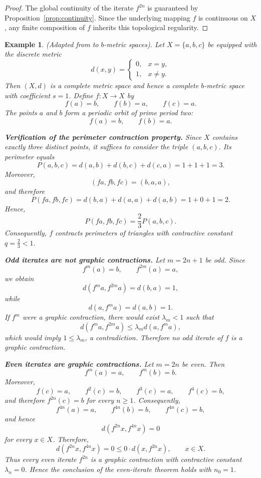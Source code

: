 \documentclass[a4paper,12pt,oneside]{article}
\newtheorem{example}[theorem]{Example}
\numberwithin{equation}{section}
\begin{document}
\begin{proof}
\medskip\noindent
The global continuity of the iterate $f^{2n}$ is guaranteed by Proposition~\ref{prop:continuity}. Since the underlying mapping $f$ is continuous on $X$, any finite composition of $f$ inherits this topological regularity. 
\end{proof}

\begin{example}
\label{ex:even_iterates}
(Adapted from \cite{cvetkovic2026} to $b$-metric spaces). Let
\(X = \{a,b,c\}\)
be equipped with the discrete metric
\[
d(x,y) = 
\begin{cases}
0, & x=y,\\
1, & x\neq y.
\end{cases}
\]
Then $(X,d)$ is a complete metric space and hence a complete $b$-metric space with coefficient $s=1$. Define $f:X\to X$ by
\[
f(a) = b,\qquad f(b) = a,\qquad f(c) = a.
\]
The points $a$ and $b$ form a periodic orbit of prime period two:
\[
f(a) = b,\qquad f(b) = a.
\]

\noindent\textbf{Verification of the perimeter contraction property.}
Since $X$ contains exactly three distinct points, it suffices to consider the triple $(a,b,c)$. Its perimeter equals
\[
P(a,b,c) = d(a,b) + d(b,c) + d(c,a) = 1 + 1 + 1 = 3.
\]
Moreover,
\[
(fa,fb,fc) = (b,a,a),
\]
and therefore
\[
P(fa,fb,fc) = d(b,a) + d(a,a) + d(a,b) = 1 + 0 + 1 = 2.
\]
Hence,
\[
P(fa,fb,fc) = \frac{2}{3} P(a,b,c).
\]
Consequently, $f$ contracts perimeters of triangles with contractive constant $q = \frac{2}{3} < 1$.

\noindent\textbf{Odd iterates are not graphic contractions.}
Let $m = 2n + 1$ be odd. Since
\[
f^{m}(a) = b,\qquad f^{2m}(a) = a,
\]
we obtain
\[
d(f^{m}a,f^{2m}a) = d(b,a) = 1,
\]
while
\[
d(a,f^{m}a) = d(a,b) = 1.
\]
If $f^{m}$ were a graphic contraction, there would exist $\lambda_{m}<1$ such that
\[
d(f^{m}a,f^{2m}a)\leq \lambda_{m}d(a,f^{m}a),
\]
which would imply $1\leq \lambda_{m}$, a contradiction. Therefore no odd iterate of $f$ is a graphic contraction.

\noindent\textbf{Even iterates are graphic contractions.}
Let $m = 2n$ be even. Then
\[
f^{m}(a) = a,\qquad f^{m}(b) = b.
\]
Moreover,
\[
f(c) = a,\qquad f^{2}(c) = b,\qquad f^{3}(c) = a,\qquad f^{4}(c) = b,
\]
and therefore $f^{2n}(c) = b$ for every $n\geq 1$. Consequently,
\[
f^{4n}(a) = a,\qquad f^{4n}(b) = b,\qquad f^{4n}(c) = b,
\]
and hence
\[
d(f^{2n}x,f^{4n}x) = 0
\]
for every $x\in X$. Therefore,
\[
d(f^{2n}x,f^{4n}x) = 0\leq 0\cdot d(x,f^{2n}x),\qquad x\in X.
\]
Thus every even iterate $f^{2n}$ is a graphic contraction with contractive constant $\lambda_{n} = 0$. Hence the conclusion of the even-iterate theorem holds with $n_0 = 1$.
\end{example}
\end{document}
